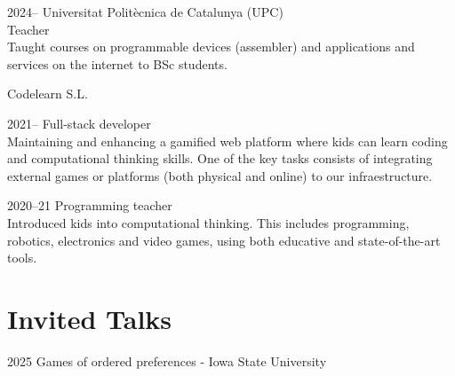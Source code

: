 \documentclass[a4paper]{report}
\begin{document}
    \begin{tablist}
      \item[2024--] \tab{}Universitat Politècnica de Catalunya (UPC)\\ Teacher\\\smallskip
        Taught courses on programmable devices (assembler) and applications and services on the internet to BSc students.
\vspace{0.5em}
      \item[] \tab{}Codelearn S.L.\vspace{-.25em}
        \item[2021--] \tab{}Full-stack developer\\\smallskip
        Maintaining and enhancing a gamified web platform where kids can learn coding and computational thinking skills. One of the key tasks consists of integrating external games or platforms (both physical and online) to our infraestructure.
       \item[2020--21] \tab{}Programming teacher\\\smallskip
       Introduced kids into computational thinking. This includes programming, robotics, electronics and video games, using both educative and state-of-the-art tools.
    \end{tablist}
\nocite{*}

\vspace{-1em}
\section*{Invited Talks}

\begin{tablist}
    \item[2025] \tab{}Games of ordered preferences - Iowa State University
\end{tablist}

\vspace{-1em}
\end{document}

